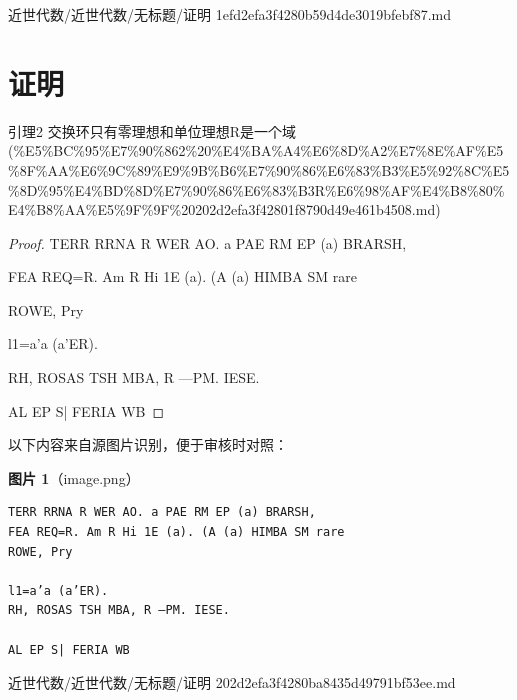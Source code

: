 \begin{note}[来源路径]

近世代数/近世代数/无标题/证明 1efd2efa3f4280b59d4de3019bfebf87.md

\end{note}

\section*{证明}

\begin{note}[来源上级主题]

引理2 交换环只有零理想和单位理想R是一个域 (\%E5\%BC\%95\%E7\%90\%862\%20\%E4\%BA\%A4\%E6\%8D\%A2\%E7\%8E\%AF\%E5\%8F\%AA\%E6\%9C\%89\%E9\%9B\%B6\%E7\%90\%86\%E6\%83\%B3\%E5\%92\%8C\%E5\%8D\%95\%E4\%BD\%8D\%E7\%90\%86\%E6\%83\%B3R\%E6\%98\%AF\%E4\%B8\%80\%E4\%B8\%AA\%E5\%9F\%9F\%20202d2efa3f42801f8790d49e461b4508.md)

\end{note}

\begin{proof}

TERR RRNA R WER AO. a PAE RM EP (a) BRARSH,

FEA REQ=R. Am R Hi 1E (a). (A (a) HIMBA SM rare

ROWE, Pry

l1=a’a (a’ER).

RH, ROSAS TSH MBA, R —PM. IESE.

AL EP S| FERIA WB

\end{proof}

\begin{note}
以下内容来自源图片识别，便于审核时对照：

\textbf{图片 1}（image.png）
\begin{Verbatim}[fontsize=\small]
TERR RRNA R WER AO. a PAE RM EP (a) BRARSH,
FEA REQ=R. Am R Hi 1E (a). (A (a) HIMBA SM rare
ROWE, Pry

l1=a’a (a’ER).
RH, ROSAS TSH MBA, R —PM. IESE.

AL EP S| FERIA WB
\end{Verbatim}

\end{note}

\begin{note}[来源路径]

近世代数/近世代数/无标题/证明 202d2efa3f4280ba8435d49791bf53ee.md

\end{note}

